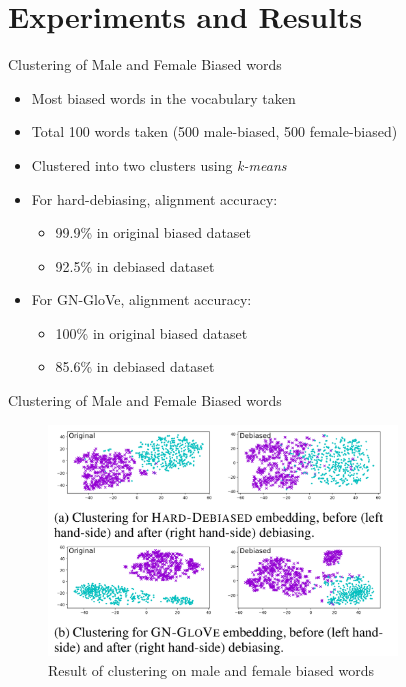 \documentclass{beamer}
\begin{document}
	
\section{Experiments and Results}
	\begin{frame}{Clustering of Male and Female Biased words}
		\begin{itemize}
			\item Most biased words in the vocabulary taken
			\item Total 100 words taken (500 male-biased, 500 female-biased)
			\item Clustered into two clusters using \emph{k-means}
			\item For hard-debiasing, alignment accuracy:
			\begin{itemize}
				\item 99.9\% in original biased dataset
				\item 92.5\% in debiased dataset
			\end{itemize}
			\item For GN-GloVe, alignment accuracy:
			\begin{itemize}
				\item 100\% in original biased dataset
				\item 85.6\% in debiased dataset
			\end{itemize}
		\end{itemize}
	\end{frame}
	
	\begin{frame}{Clustering of Male and Female Biased words}
			\vspace{3mm}
			\begin{figure}[htbp]
				\centerline{\includegraphics[width=25em]{Cluster_Male_Female_Bias.png}}
				\caption{Result of clustering on male and female biased words}
				\label{bias-cluster-fig}
			\end{figure}
	\end{frame}
	
\end{document}
